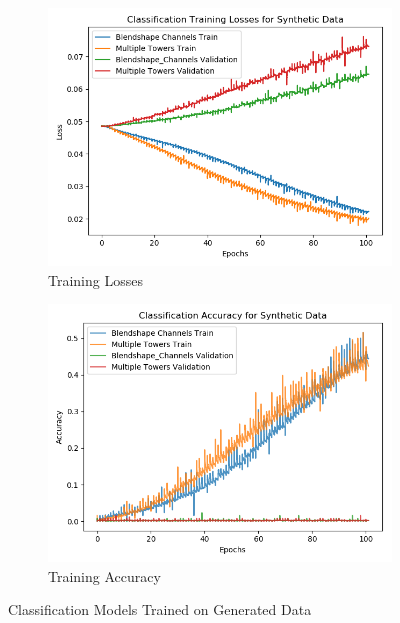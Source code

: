 \begin{figure}[h!]
    \centering
    \begin{subfigure}[b]{0.49\textwidth}
        \includegraphics[width=\textwidth]{figures/gan/classification_losses.png}
        \caption{Training Losses}\label{fig:gan_classification_synth_losses}
    \end{subfigure}
    \begin{subfigure}[b]{0.49\textwidth}
        \includegraphics[width=\textwidth]{figures/gan/classification_acc.png}
        \caption{Training Accuracy}\label{fig:gan_classification_synth_acc}
    \end{subfigure}
    \caption{Classification Models Trained on Generated Data}\label{fig:gan_synth_classification}
\end{figure}

